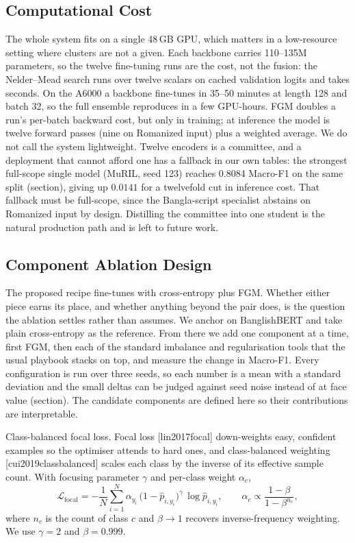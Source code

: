 \documentclass[11pt,a4paper]{article}
\def\citep#1{[#1]}%
\def\cref#1{section}%
\def\emph#1{#1}%
\begin{document}
\subsection{Computational Cost}
\label{sec:cost}

The whole system fits on a single 48\,GB GPU, which matters in a low-resource setting where clusters are not a given. Each backbone carries 110--135M parameters, so the twelve fine-tuning runs are the cost, not the fusion: the Nelder--Mead search runs over twelve scalars on cached validation logits and takes seconds. On the A6000 a backbone fine-tunes in 35--50 minutes at length 128 and batch 32, so the full ensemble reproduces in a few GPU-hours. FGM doubles a run's per-batch backward cost, but only in training; at inference the model is twelve forward passes (nine on Romanized input) plus a weighted average. We do not call the system lightweight. Twelve encoders is a committee, and a deployment that cannot afford one has a fallback in our own tables: the strongest full-scope single model (MuRIL, seed 123) reaches 0.8084 Macro-F1 on the same split (\cref{tab:perrun}), giving up $0.0141$ for a twelvefold cut in inference cost. That fallback must be full-scope, since the Bangla-script specialist abstains on Romanized input by design. Distilling the committee into one student is the natural production path and is left to future work.

\subsection{Component Ablation Design}
\label{sec:ablation-design}

The proposed recipe fine-tunes with cross-entropy plus FGM. Whether either piece earns its place, and whether anything beyond the pair does, is the question the ablation settles rather than assumes. We anchor on BanglishBERT and take plain cross-entropy as the reference. From there we add one component at a time, first FGM, then each of the standard imbalance and regularisation tools that the usual playbook stacks on top, and measure the change in Macro-F1. Every configuration is run over three seeds, so each number is a mean with a standard deviation and the small deltas can be judged against seed noise instead of at face value (\cref{sec:ablation-results}). The candidate components are defined here so their contributions are interpretable.

\emph{Class-balanced focal loss.} Focal loss \citep{lin2017focal} down-weights easy, confident examples so the optimiser attends to hard ones, and class-balanced weighting \citep{cui2019classbalanced} scales each class by the inverse of its effective sample count. With focusing parameter $\gamma$ and per-class weight $\alpha_c$,
\begin{equation}
\mathcal{L}_{\mathrm{focal}} = -\frac{1}{N}\sum_{i=1}^{N} \alpha_{y_i}\,\big(1 - \hat{p}_{i,y_i}\big)^{\gamma}\,\log \hat{p}_{i,y_i},
\qquad
\alpha_c \propto \frac{1 - \beta}{1 - \beta^{n_c}},
\label{eq:focal}
\end{equation}
where $n_c$ is the count of class $c$ and $\beta \to 1$ recovers inverse-frequency weighting. We use $\gamma = 2$ and $\beta = 0.999$.
\end{document}
